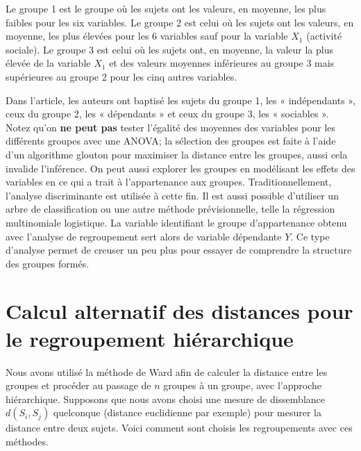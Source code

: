 \documentclass[
  11pt,
  letterpaper,
]{book}
\theoremstyle{definition}
\theoremstyle{definition}
\theoremstyle{definition}
\theoremstyle{definition}
\theoremstyle{remark}
\begin{document}
Le groupe 1 est le groupe où les sujets ont les valeurs, en moyenne, les plus faibles pour les six variables. Le groupe 2 est celui où les sujets ont les valeurs, en moyenne, les plus élevées pour les 6 variables sauf pour la variable \(X_1\) (activité sociale). Le groupe 3 est celui où les sujets ont, en moyenne, la valeur la plus élevée de la variable \(X_1\) et des valeurs moyennes inférieures au groupe 3 mais supérieures au groupe 2 pour les cinq autres variables.

Dans l'article, les auteurs ont baptisé les sujets du groupe 1, les « indépendants », ceux du groupe 2, les « dépendants » et ceux du groupe 3, les « sociables ».
Notez qu'on \textbf{ne peut pas} tester l'égalité des moyennes des variables pour les différents groupes avec une ANOVA; la sélection des groupes est faite à l'aide d'un algorithme glouton pour maximiser la distance entre les groupes, aussi cela invalide l'inférence. On peut aussi explorer les groupes en modélisant les effets des variables en ce qui a trait à l'appartenance aux groupes. Traditionnellement, l'analyse discriminante est utilisée à cette fin. Il est aussi possible d'utiliser un arbre de classification ou une autre méthode prévisionnelle, telle la régression multinomiale logistique. La variable identifiant le groupe d'appartenance obtenu avec l'analyse de regroupement sert alors de variable dépendante \(Y\). Ce type d'analyse permet de creuser un peu plus pour essayer de comprendre la structure des groupes formés.

\hypertarget{calcul-alternatif-des-distances-pour-le-regroupement-hiuxe9rarchique}{%
\section{Calcul alternatif des distances pour le regroupement hiérarchique}\label{calcul-alternatif-des-distances-pour-le-regroupement-hiuxe9rarchique}}

Nous avons utilisé la méthode de Ward afin de calculer la distance entre les groupes et procéder au passage de \(n\) groupes à un groupe, avec l'approche hiérarchique. Supposons que nous avons choisi une mesure de dissemblance \(d(S_i, S_j)\) quelconque (distance euclidienne par exemple) pour mesurer la distance entre deux sujets. Voici comment sont choisis les regroupements avec ces méthodes.
\end{document}
